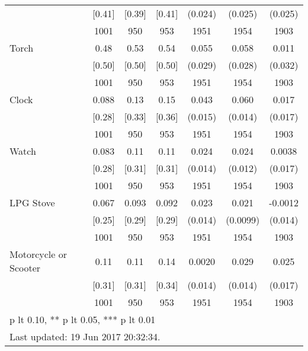 \begin{table}[htbp]
\begin{tabular*}{1\hsize}{@{\hskip\tabcolsep\extracolsep\fill}l*{1}{cccccc}}
                                &   [0.41]&   [0.39]&   [0.41]&  (0.024)         &  (0.025)         &  (0.025)         \\
                                &     1001&      950&      953&     1951         &     1954         &     1903         \\
Torch                           &     0.48&     0.53&     0.54&    0.055\sym{*}  &    0.058\sym{**} &    0.011         \\
                                &   [0.50]&   [0.50]&   [0.50]&  (0.029)         &  (0.028)         &  (0.032)         \\
                                &     1001&      950&      953&     1951         &     1954         &     1903         \\
Clock                           &    0.088&     0.13&     0.15&    0.043\sym{***}&    0.060\sym{***}&    0.017         \\
                                &   [0.28]&   [0.33]&   [0.36]&  (0.015)         &  (0.014)         &  (0.017)         \\
                                &     1001&      950&      953&     1951         &     1954         &     1903         \\
Watch                           &    0.083&     0.11&     0.11&    0.024\sym{*}  &    0.024\sym{*}  &   0.0038         \\
                                &   [0.28]&   [0.31]&   [0.31]&  (0.014)         &  (0.012)         &  (0.017)         \\
                                &     1001&      950&      953&     1951         &     1954         &     1903         \\
LPG Stove                       &    0.067&    0.093&    0.092&    0.023         &    0.021\sym{**} &  -0.0012         \\
                                &   [0.25]&   [0.29]&   [0.29]&  (0.014)         & (0.0099)         &  (0.014)         \\
                                &     1001&      950&      953&     1951         &     1954         &     1903         \\
Motorcycle or Scooter           &     0.11&     0.11&     0.14&   0.0020         &    0.029\sym{**} &    0.025         \\
                                &   [0.31]&   [0.31]&   [0.34]&  (0.014)         &  (0.014)         &  (0.017)         \\
                                &     1001&      950&      953&     1951         &     1954         &     1903         \\
\bottomrule
\multicolumn{7}{l}{\footnotesize * p lt 0.10, ** p lt 0.05, *** p lt 0.01}\\
\multicolumn{7}{l}{\footnotesize Last updated: 19 Jun 2017 20:32:34.}\\
\end{tabular*}
\end{table}
